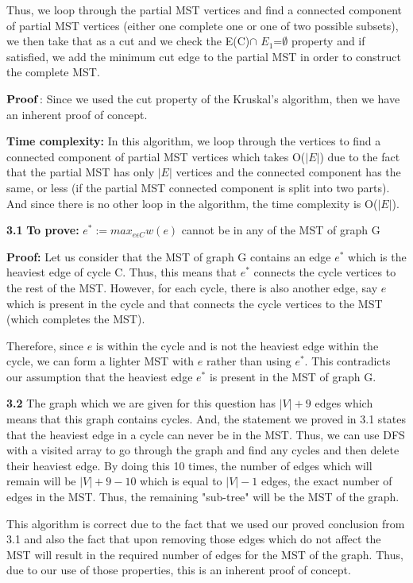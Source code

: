 \documentclass[letterpaper,11pt]{article}
\newcounter{problemid}\stepcounter{problemid}
\def\newproblem{\vspace*{0.5cm}{\bf Problem~\arabic{problemid}\stepcounter{problemid}}\hfill\fbox{\parbox{0.16\textwidth}{\bf Points:}}\par}
\begin{document}
Thus, we loop through the partial MST vertices and find a connected component of partial MST vertices (either one complete one or one of two possible subsets), we then take that as a cut and we check the E(C)$\cap$ $E_{1}$=$\emptyset$ property and if satisfied, we add the minimum cut edge to the partial MST in order to construct the complete MST. 

$\bf Proof$: Since we used the cut property of the Kruskal's algorithm, then we have an inherent proof of concept.

{\bf Time complexity:} In this algorithm, we loop through the vertices to find a connected component of partial MST vertices which takes O($|E|$) due to the fact that the partial MST has only $|E|$ vertices and the connected component has the same, or less (if the partial MST connected component is split into two parts). And since there is no other loop in the algorithm, the time complexity is O($|E|$).

\newproblem

{\bf 3.1} {\bf To prove:} $e^* := max_{e\epsilon C} w(e)$ cannot be in any of the MST of graph G 

{\bf Proof:}
Let us consider that the MST of graph G contains an edge $e^*$ which is the heaviest edge of cycle C. Thus, this means that $e^*$ connects the cycle vertices to the rest of the MST. However, for each cycle, there is also another edge, say $e$ which is present in the cycle and that connects the cycle vertices to the MST (which completes the MST). 

Therefore, since $e$ is within the cycle and is not the heaviest edge within the cycle, we can form a lighter MST with  $e$ rather than using  $e^*$. This contradicts our assumption that the heaviest edge $e^*$ is present in the MST of graph G.

{\bf 3.2} The graph which we are given for this question has $|V| + 9$ edges which means that this graph contains cycles. And, the statement we proved in 3.1 states that the heaviest edge in a cycle can never be in the MST. Thus, we can use DFS with a visited array to go through the graph and find any cycles and then delete their heaviest edge. By doing this 10 times, the number of edges which will remain will be $|V| + 9 - 10$ which is equal to $|V|-1$ edges, the exact number of edges in the MST. Thus, the remaining "sub-tree" will be the MST of the graph.

This algorithm is correct due to the fact that we used our proved conclusion from 3.1 and also the fact that upon removing those edges which do not affect the MST will result in the required number of edges for the MST of the graph. Thus, due to our use of those properties, this is an inherent proof of concept.
\end{document}
